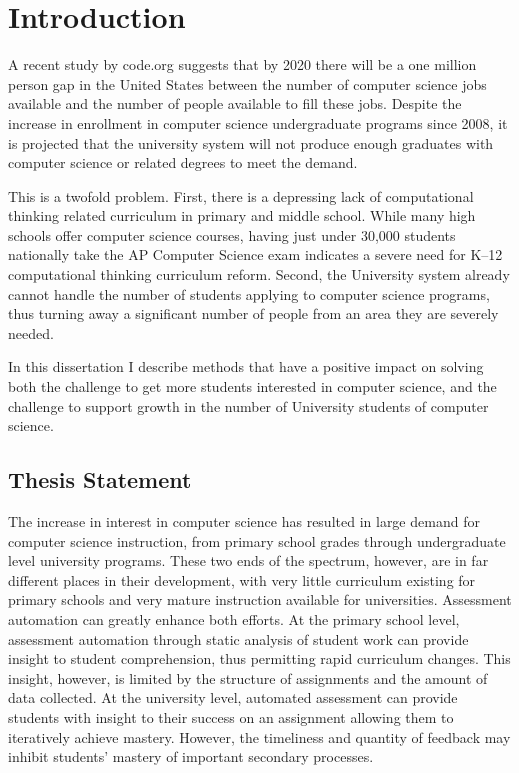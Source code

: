\chapter{Introduction} \label{chap:introduction}
A recent study by code.org suggests that by 2020 there will be a one million
person gap in the United States between the number of computer science jobs
available and the number of people available to fill these jobs. Despite the
increase in enrollment in computer science undergraduate programs since 2008,
it is projected that the university system will not produce enough graduates
with computer science or related degrees to meet the demand.

This is a twofold problem. First, there is a depressing lack of computational
thinking related curriculum in primary and middle school. While many high
schools offer computer science courses, having just under 30,000 students
nationally take the AP Computer Science exam indicates a severe need for K--12
computational thinking curriculum reform. Second, the University system already
cannot handle the number of students applying to computer science programs,
thus turning away a significant number of people from an area they are severely
needed.

In this dissertation I describe methods that have a positive impact on solving
both the challenge to get more students interested in computer science, and the
challenge to support growth in the number of University students of computer
science.

\section{Thesis Statement}
The increase in interest in computer science has resulted in large demand for
computer science instruction, from primary school grades through undergraduate
level university programs. These two ends of the spectrum, however, are in far
different places in their development, with very little curriculum existing for
primary schools and very mature instruction available for
universities. Assessment automation can greatly enhance both efforts. At the
primary school level, assessment automation through static analysis of student
work can provide insight to student comprehension, thus permitting rapid
curriculum changes. This insight, however, is limited by the structure of
assignments and the amount of data collected. At the university level,
automated assessment can provide students with insight to their success on an
assignment allowing them to iteratively achieve mastery. However, the
timeliness and quantity of feedback may inhibit students' mastery of important
secondary processes.

